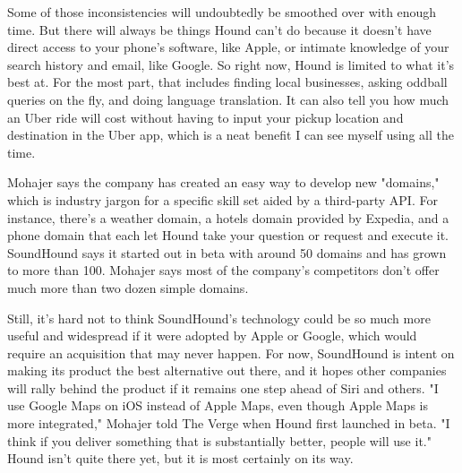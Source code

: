\documentclass[12pt,a4paper]{article}
\begin{document}
Some of those inconsistencies will undoubtedly be smoothed over with enough time. But there will always be things Hound can't do because it doesn't have direct access to your phone's software, like Apple, or intimate knowledge of your search history and email, like Google. So right now, Hound is limited to what it's best at. For the most part, that includes finding local businesses, asking oddball queries on the fly, and doing language translation. It can also tell you how much an Uber ride will cost without having to input your pickup location and destination in the Uber app, which is a neat benefit I can see myself using all the time.
 
\par Mohajer says the company has created an easy way to develop new "domains," which is industry jargon for a specific skill set aided by a third-party API. For instance, there's a weather domain, a hotels domain provided by Expedia, and a phone domain that each let Hound take your question or request and execute it. SoundHound says it started out in beta with around 50 domains and has grown to more than 100. Mohajer says most of the company's competitors don't offer much more than two dozen simple domains.
\par Still, it's hard not to think SoundHound's technology could be so much more useful and widespread if it were adopted by Apple or Google, which would require an acquisition that may never happen. For now, SoundHound is intent on making its product the best alternative out there, and it hopes other companies will rally behind the product if it remains one step ahead of Siri and others. "I use Google Maps on iOS instead of Apple Maps, even though Apple Maps is more integrated," Mohajer told The Verge when Hound first launched in beta. "I think if you deliver something that is substantially better, people will use it." Hound isn't quite there yet, but it is most certainly on its way.

\newpage
\end{document}
